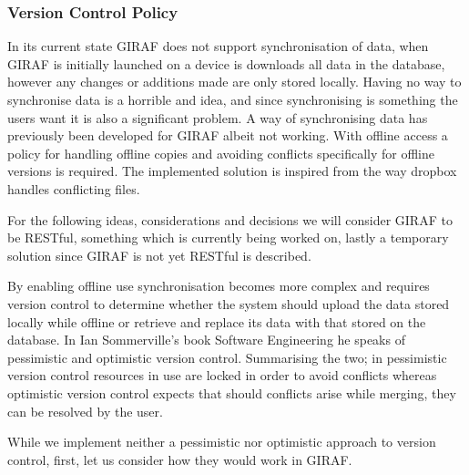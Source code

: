 \subsubsection*{Version Control Policy}
In its current state GIRAF does not support synchronisation of data, when GIRAF is initially launched on a device is downloads all data in the database, however any changes or additions made are only stored locally.
Having no way to synchronise data is a horrible and idea, and since synchronising is something the users want it is also a significant problem.
A way of synchronising data has previously been developed for GIRAF albeit not working.
With offline access a policy for handling offline copies and avoiding conflicts specifically for offline versions is required.
The implemented solution is inspired from the way dropbox handles conflicting files.

\bigskip
For the following ideas, considerations and decisions we will consider GIRAF to be RESTful, something which is currently being worked on, lastly a temporary solution since GIRAF is not yet RESTful is described.

By enabling offline use synchronisation becomes more complex and requires version control to determine whether the system should upload the data stored locally while offline or retrieve and replace its data with that stored on the database.
In Ian Sommerville's book Software Engineering \citep{SEBOOK} he speaks of pessimistic and optimistic version control.
Summarising the two; in pessimistic version control resources in use are locked in order to avoid conflicts whereas optimistic version control expects that should conflicts arise while merging, they can be resolved by the user.

\bigskip  \noindent
While we implement neither a pessimistic nor optimistic approach to version control, first, let us consider how they would work in GIRAF.

